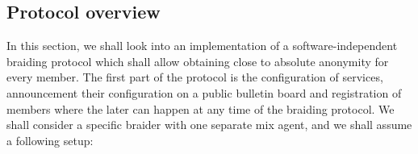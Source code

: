 \documentclass[12pt]{article}
\newenvironment{definition}[2][Definition]{\begin{trivlist}
\item[\hskip \labelsep {\bfseries #1}\hskip \labelsep {\bfseries #2.}]}{\end{trivlist}}
\begin{document}





\subsection*{Protocol overview}

In this section, we shall look into an implementation of a software-independent braiding protocol which shall allow obtaining close to absolute anonymity for every member. The first part of the protocol is the configuration of services, announcement their configuration on a public bulletin board and registration of members where the later can happen at any time of the braiding protocol. We shall consider a specific braider with one separate mix agent, and we shall assume a following setup:
\end{document}
